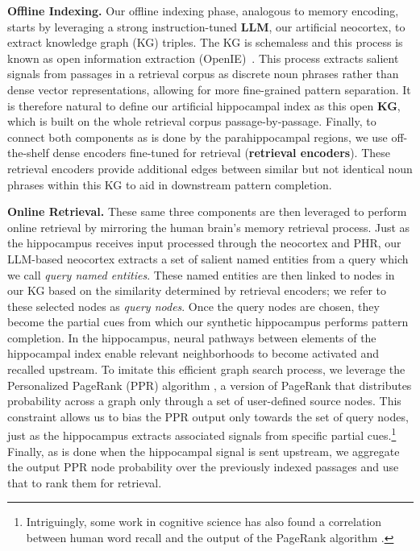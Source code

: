 \documentclass{article}
\begin{document}
\noindent \textbf{Offline Indexing.} Our offline indexing phase, analogous to memory encoding, starts by leveraging a strong instruction-tuned \textbf{LLM}, our artificial neocortex, to extract knowledge graph (KG) triples. 
The KG is schemaless and this process is known as open information extraction (OpenIE)~\cite{angeli-etal-2015-leveraging-openie, openie_from_web_banko, pei-etal-2023-use-openie, ijcai2022p0793_openie_zhou}.
This process extracts salient signals from passages in a retrieval corpus as discrete noun phrases rather than dense vector representations, allowing for more fine-grained pattern separation. 
It is therefore natural to define our artificial hippocampal index as this open \textbf{KG}, which is built on the whole retrieval corpus passage-by-passage.
Finally, to connect both components as is done by the parahippocampal regions, we use off-the-shelf dense encoders fine-tuned for retrieval (\textbf{retrieval encoders}).
These retrieval encoders provide additional edges between similar but not identical noun phrases within this KG to aid in downstream pattern completion.

\noindent \textbf{Online Retrieval.} These same three components are then leveraged to perform online retrieval by mirroring the human brain's memory retrieval process. 
Just as the hippocampus receives input processed through the neocortex and PHR, our LLM-based neocortex extracts a set of salient named entities from a query which we call \textit{query named entities}.
These named entities are then linked to nodes in our KG based on the similarity determined by retrieval encoders; we refer to these selected nodes as \textit{query nodes}.
Once the query nodes are chosen, they become the partial cues from which our synthetic hippocampus performs pattern completion.
In the hippocampus, neural pathways between elements of the hippocampal index enable relevant neighborhoods to become activated and recalled upstream. 
To imitate this efficient graph search process, we leverage the Personalized PageRank (PPR) algorithm \cite{david02topic}, a version of PageRank that distributes probability across a graph only through a set of user-defined source nodes.
This constraint allows us to bias the PPR output only towards the set of query nodes, just as the hippocampus extracts associated signals from specific partial cues.\footnote{Intriguingly, some work in cognitive science has also found a correlation between human word recall and the output of the PageRank algorithm \cite{22Griffiths2007GoogleAT}.}
Finally, as is done when the hippocampal signal is sent upstream, we aggregate the output PPR node probability over the previously indexed passages and use that to rank them for retrieval.
\end{document}
